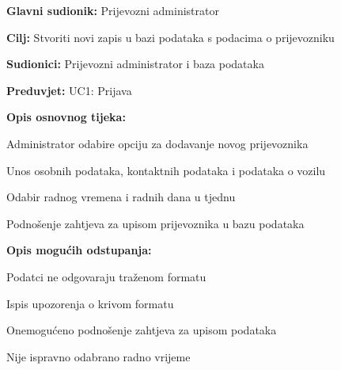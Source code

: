 					\noindent {}
					\begin{packed_item}
						
						\item \textbf{Glavni sudionik: }Prijevozni administrator
						\item  \textbf{Cilj:} Stvoriti novi zapis u bazi podataka s podacima o prijevozniku
						\item  \textbf{Sudionici:} Prijevozni administrator i baza podataka
						\item  \textbf{Preduvjet:} UC1: Prijava
						\item  \textbf{Opis osnovnog tijeka:}
						
						\item[] \begin{packed_enum}
							
							\item Administrator odabire opciju za dodavanje novog prijevoznika
							\item Unos osobnih podataka, kontaktnih podataka i podataka o vozilu
							\item Odabir radnog vremena i radnih dana u tjednu
							\item Podnošenje zahtjeva za upisom prijevoznika u bazu podataka
							
						\end{packed_enum}
						
						\item  \textbf{Opis mogućih odstupanja:}
						
						\item[] \begin{packed_item}
							
							\item[2.a] Podatci ne odgovaraju traženom formatu 
							\item[] \begin{packed_enum}
								
								\item Ispis upozorenja o krivom formatu
								\item Onemogućeno podnošenje zahtjeva za upisom podataka
								
							\end{packed_enum}
							
							\item[3.a] Nije ispravno odabrano radno vrijeme
							\item[] \begin{packed_enum}
								

\end{packed_enum}
\end{packed_item}
\end{packed_item}
